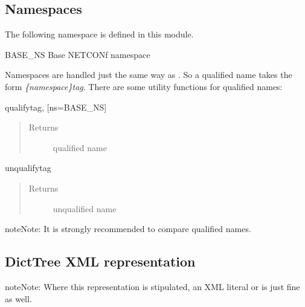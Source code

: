 \documentclass[a4paper,10pt,english]{manual}
\begin{document}
\subsection{Namespaces}

The following namespace is defined in this module.

\hypertarget{ncclient.content.BASE_NS}{}\begin{datadesc}{BASE\_NS}
Base NETCONf namespace
\end{datadesc}

Namespaces are handled just the same way as \href{http://docs.python.org/library/xml.etree.elementtree.html\#module-xml.etree.ElementTree}{}. So a qualified name takes the form \emph{\{namespace\}tag}. There are some utility functions for qualified names:

\hypertarget{ncclient.content.qualify}{}\begin{funcdesc}{qualify}{tag, {[}ns=BASE\_NS{]}}~\begin{quote}\begin{description}
\item[Returns]
qualified name

\end{description}\end{quote}
\end{funcdesc}

\hypertarget{ncclient.content.unqualify}{}\begin{funcdesc}{unqualify}{tag}~\begin{quote}\begin{description}
\item[Returns]
unqualified name

\end{description}\end{quote}

\begin{notice}{note}{Note:}
It is strongly recommended to compare qualified names.
\end{notice}
\end{funcdesc}
\hypertarget{dtree}{}

\subsection{DictTree XML representation}

\begin{notice}{note}{Note:}
Where this representation is stipulated, an XML literal or \href{http://docs.python.org/library/xml.etree.elementtree.html\#xml.etree.ElementTree.Element}{} is just fine as well.
\end{notice}
\end{document}
